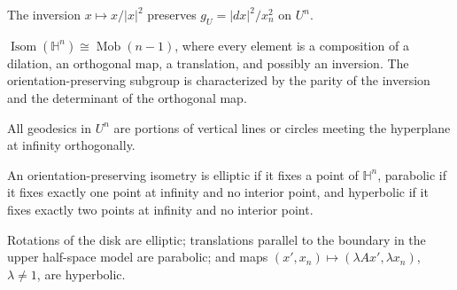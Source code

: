 \begin{lemma}
\label{lem:chow-iv-inversion-hyperbolic-isometry}

The inversion \(x\mapsto x/|x|^2\) preserves \(g_U=|dx|^2/x_n^2\) on \(U^n\).
\end{lemma}

\begin{lemma}
\label{lem:chow-iv-isometry-group-hyperbolic-space}

\(\operatorname{Isom}(\mathbb H^n)\cong\operatorname{Mob}(n-1)\), where every
element is a composition of a dilation, an orthogonal map, a translation, and
possibly an inversion.  The orientation-preserving subgroup is characterized
by the parity of the inversion and the determinant of the orthogonal map.
\end{lemma}

\begin{lemma}
\label{lem:chow-iv-upper-half-space-geodesics}

All geodesics in \(U^n\) are portions of vertical lines or circles meeting the
hyperplane at infinity orthogonally.
\end{lemma}

\begin{definition}
\label{def:chow-iv-isometry-types}

An orientation-preserving isometry is elliptic if it fixes a point of
\(\mathbb H^n\), parabolic if it fixes exactly one point at infinity and no
interior point, and hyperbolic if it fixes exactly two points at infinity and
no interior point.
\end{definition}

\begin{example}
\label{ex:chow-iv-standard-isometry-types}

Rotations of the disk are elliptic; translations parallel to the boundary in
the upper half-space model are parabolic; and maps
\((x',x_n)\mapsto(\lambda A x',\lambda x_n)\), \(\lambda\ne1\), are hyperbolic.
\end{example}

